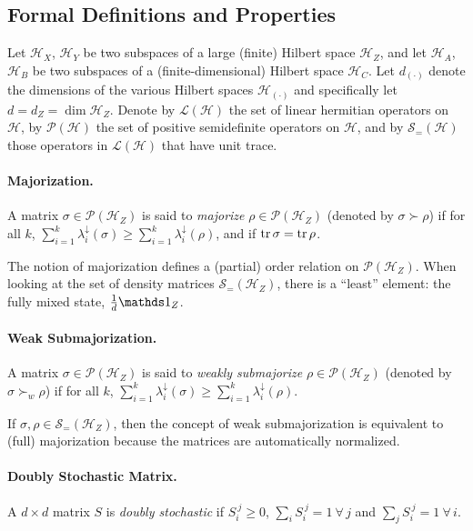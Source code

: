 \documentclass[12pt,a4paper]{article}
\def\Hs{\mathscr{H}}%
\newcommand{\lD}{\lambda^\downarrow}
\newcommand{\LOps}{\mathscr{L}}
\newcommand{\POps}{\mathscr{P}}
\newcommand{\DOps}{\mathscr{S}_=}
\begin{document}
\subsection{Formal Definitions and Properties}

Let $\Hs_X$, $\Hs_Y$ be two subspaces of a large (finite) Hilbert space $\Hs_Z$, and let
$\Hs_A$, $\Hs_B$ be two subspaces of a (finite-dimensional) Hilbert space $\Hs_C$. Let $d_{(\cdot)}$ denote
 the dimensions of the various Hilbert
spaces $\Hs_{(\cdot)}$ and specifically let $d=d_Z=\dim\Hs_Z$. Denote by $\LOps(\Hs)$ the set of linear
hermitian operators on $\Hs$, by $\POps(\Hs)$ the set of positive semidefinite operators on $\Hs$, and
by $\DOps(\Hs)$ those operators in $\LOps(\Hs)$ that have unit trace.

\paragraph{Majorization.} A matrix $\sigma\in\POps(\Hs_Z)$ is said to {\em majorize} $\rho\in\POps(\Hs_Z)$
(denoted by $\sigma\succ\rho$) if for all $k$, $\sum_{i=1}^k \lD_i(\sigma) \geqslant \sum_{i=1}^k \lD_i(\rho)$,
and if $\operatorname{tr}\sigma=\operatorname{tr}\rho$.

The notion of majorization defines a (partial) order relation on $\POps(\Hs_Z)$. When looking at the
set of density matrices $\DOps(\Hs_Z)$, there is a ``least'' element: the fully mixed state,
$\frac{1}{d}\Ident_Z$.

\paragraph{Weak Submajorization.} A matrix $\sigma\in\POps(\Hs_Z)$ is said to {\em weakly submajorize}
$\rho\in\POps(\Hs_Z)$ (denoted by $\sigma\succ_w\rho$) if for all $k$,
$\sum_{i=1}^k \lD_i(\sigma) \geqslant \sum_{i=1}^k \lD_i(\rho)$.

\begin{remark*}
  If $\sigma,\rho\in\DOps(\Hs_Z)$, then the concept of weak submajorization is equivalent to (full)
  majorization because the matrices are automatically normalized.
\end{remark*}

\paragraph{Doubly Stochastic Matrix.} A $d\times d$ matrix $S$ is {\em doubly stochastic} if
$S_i^{~j}\geqslant 0$, $\sum_i S_i^{~j} = 1~\forall\,j$ and $\sum_j S_i^{~j} = 1~\forall\,i$.
\end{document}
